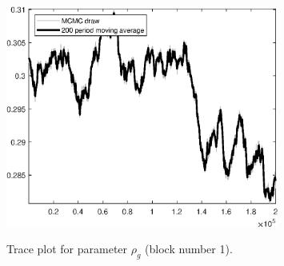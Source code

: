 \begin{figure}[H]
\centering
  \includegraphics[width=0.8\textwidth]{RBC_growth/graphs/TracePlot_rho_g_blck_1}\\
    \caption{Trace plot for parameter ${\rho_g}$ (block number 1).}
\end{figure}
